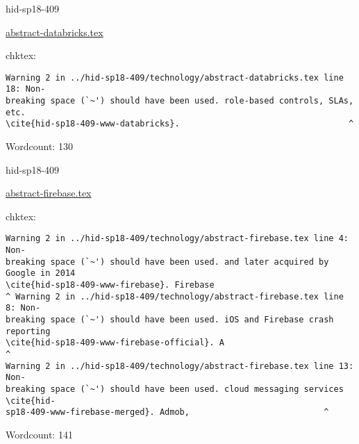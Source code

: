 \begin{IU}

hid-sp18-409

\href{https://github.com/cloudmesh-community/hid-sp18-409/blob/master//technology/abstract-databricks.tex}{abstract-databricks.tex}

 
chktex:
\begin{tiny}
\begin{verbatim}
Warning 2 in ../hid-sp18-409/technology/abstract-databricks.tex line 18: Non-
breaking space (`~') should have been used. role-based controls, SLAs, etc.
\cite{hid-sp18-409-www-databricks}.                                  ^
\end{verbatim}
\end{tiny}

Wordcount: 130

\end{IU}



\begin{IU}

hid-sp18-409

\href{https://github.com/cloudmesh-community/hid-sp18-409/blob/master//technology/abstract-firebase.tex}{abstract-firebase.tex}

 
chktex:
\begin{tiny}
\begin{verbatim}
Warning 2 in ../hid-sp18-409/technology/abstract-firebase.tex line 4: Non-
breaking space (`~') should have been used. and later acquired by Google in 2014
\cite{hid-sp18-409-www-firebase}. Firebase
^ Warning 2 in ../hid-sp18-409/technology/abstract-firebase.tex line 8: Non-
breaking space (`~') should have been used. iOS and Firebase crash reporting
\cite{hid-sp18-409-www-firebase-official}. A                                   ^
Warning 2 in ../hid-sp18-409/technology/abstract-firebase.tex line 13: Non-
breaking space (`~') should have been used. cloud messaging services \cite{hid-
sp18-409-www-firebase-merged}. Admob,                           ^
\end{verbatim}
\end{tiny}

Wordcount: 141

\end{IU}



